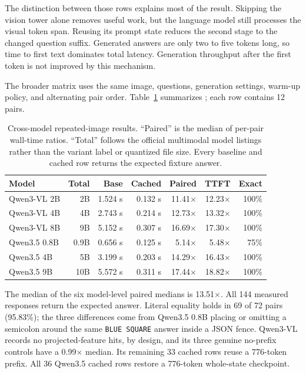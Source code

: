 \documentclass[11pt]{article}
\begin{document}
The distinction between those rows explains most of the result. Skipping the vision tower alone removes useful work, but the language model still processes the visual token span. Reusing its prompt state reduces the second stage to the changed question suffix. Generated answers are only two to five tokens long, so time to first text dominates total latency. Generation throughput after the first token is not improved by this mechanism.

The broader matrix uses the same image, questions, generation settings, warm-up policy, and alternating pair order. Table~\ref{tab:visionmatrix} summarizes ; each row contains 12 pairs.

\begin{table}[H]
\centering
\scriptsize
\begin{tabular}{lrrrrrr}
\toprule
Model & Total & Base & Cached & Paired & TTFT & Exact \\
\midrule
Qwen3-VL 2B & 2B & 1.524 s & 0.132 s & 11.41$\times$ & 12.23$\times$ & 100\% \\
Qwen3-VL 4B & 4B & 2.743 s & 0.214 s & 12.73$\times$ & 13.32$\times$ & 100\% \\
Qwen3-VL 8B & 9B & 5.152 s & 0.307 s & 16.69$\times$ & 17.30$\times$ & 100\% \\
Qwen3.5 0.8B & 0.9B & 0.656 s & 0.125 s & 5.14$\times$ & 5.48$\times$ & 75\% \\
Qwen3.5 4B & 5B & 3.199 s & 0.203 s & 14.29$\times$ & 16.43$\times$ & 100\% \\
Qwen3.5 9B & 10B & 5.572 s & 0.311 s & 17.44$\times$ & 18.82$\times$ & 100\% \\
\bottomrule
\end{tabular}
\caption{Cross-model repeated-image results. ``Paired'' is the median of per-pair wall-time ratios. ``Total'' follows the official multimodal model listings rather than the variant label or quantized file size. Every baseline and cached row returns the expected fixture answer.}
\label{tab:visionmatrix}
\end{table}

The median of the six model-level paired medians is 13.51$\times$. All 144 measured responses return the expected answer. Literal equality holds in 69 of 72 pairs (95.83\%); the three differences come from Qwen3.5 0.8B placing or omitting a semicolon around the same \texttt{BLUE SQUARE} answer inside a JSON fence. Qwen3-VL records no projected-feature hits, by design, and its three genuine no-prefix controls have a 0.99$\times$ median. Its remaining 33 cached rows reuse a 776-token prefix. All 36 Qwen3.5 cached rows restore a 776-token whole-state checkpoint.
\end{document}
